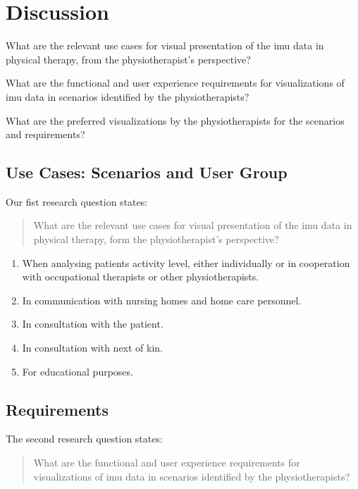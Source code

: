 \chapter{Discussion}


\begin{description}[parsep=0pt, itemsep=0pt]
\item[Research Question 1:] What are the relevant use cases for visual presentation of the \gls{imu} data in physical therapy, from the physiotherapist's perspective?

\item[Research Question 2:] What are the functional and user experience requirements for visualizations of \gls{imu} data in scenarios identified by the physiotherapists?

\item[Research Question 3:] What are the preferred visualizations by the physiotherapists for the scenarios and requirements?
\end{description}

\section{Use Cases: Scenarios and User Group}
Our fist research question states:
\begin{quote}
What are the relevant use cases for visual presentation of the \gls{imu} data in physical therapy, form the physiotherapist's perspective?
\end{quote}

\begin{enumerate}[itemsep=0cm, parsep=0cm]
\item When analysing patients activity level, either individually or in cooperation with occupational therapists or other physiotherapists.
\item In communication with nursing homes and home care personnel.
\item In consultation with the patient.
\item In consultation with next of kin.
\item For educational purposes.
\end{enumerate}

\section{Requirements}
The second research question states:
\begin{quote}
What are the functional and user experience requirements for visualizations of \gls{imu} data in scenarios identified by the physiotherapists?
\end{quote}


